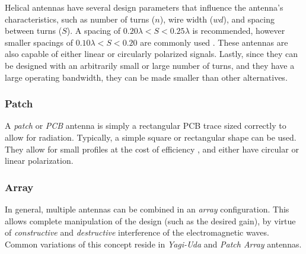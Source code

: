 Helical antennas have several design parameters that influence the antenna's characteristics, such as number of turns ($n$), wire width ($wd$), and spacing between turns ($S$). A spacing of $0.20 \lambda < S < 0.25 \lambda$ is recommended, however smaller spacings of $0.10 \lambda < S < 0.20$ are commonly used \cite{site-helicalCalculator}. These antennas are also capable of either linear or circularly polarized signals. Lastly, since they can be designed with an arbitrarily small or large number of turns, and they have a large operating bandwidth, they can be made smaller than other alternatives.

\subsubsection{Patch}
A \textit{patch} or \textit{PCB} antenna is simply a rectangular PCB trace sized correctly to allow for radiation. Typically, a simple square or rectangular shape can be used. They allow for small profiles at the cost of efficiency \cite{site-antennaTheory}, and either have circular or linear polarization.

\subsubsection{Array}
In general, multiple antennas can be combined in an \textit{array} configuration. This allows complete manipulation of the design (such as the desired gain), by virtue of \textit{constructive} and \textit{destructive} interference of the electromagnetic waves. Common variations of this concept reside in \textit{Yagi-Uda} and \textit{Patch Array} antennas. \cite{site-antennaTheory}

